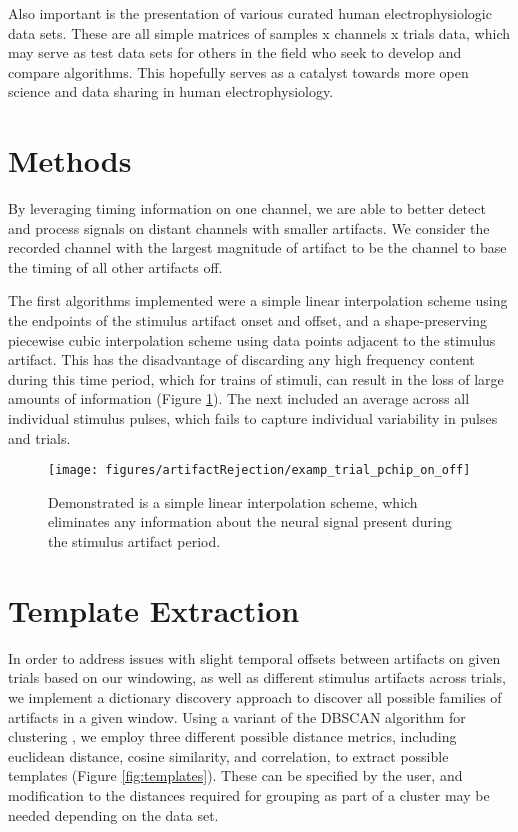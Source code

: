 Also important is the presentation of various curated human electrophysiologic data sets. These are all simple matrices of samples x channels x trials data, which may serve as test data sets for others in the field who seek to develop and compare algorithms. This hopefully serves as a catalyst towards more open science and data sharing in human electrophysiology. 

\section{Methods}
By leveraging timing information on one channel, we are able to better detect and process signals on distant channels with smaller artifacts. We consider the recorded channel with the largest magnitude of artifact to be the channel to base the timing of all other artifacts off. 

The first algorithms implemented were a simple linear interpolation scheme using the endpoints of the stimulus artifact onset and offset, and a shape-preserving piecewise cubic interpolation scheme using data points adjacent to the stimulus artifact. This has the disadvantage of discarding any high frequency content during this time period, which for trains of stimuli, can result in the loss of large amounts of information (Figure \ref{fig:exampInterp}). The next included an average across all individual stimulus pulses, which fails to capture individual variability in pulses and trials.  


\begin{figure}[ht]
	\centering
	\texttt{[image: figures/artifactRejection/examp\_trial\_pchip\_on\_off]}
	\caption[Example of linear interpolation]{Demonstrated is a simple linear interpolation scheme, which eliminates any information about the neural signal present during the stimulus artifact period. }
	\label{fig:exampInterp}
\end{figure}


\section{Template Extraction}

In order to address issues with slight temporal offsets between artifacts on given trials based on our windowing, as well as different stimulus artifacts across trials, we implement a dictionary discovery approach to discover all possible families of artifacts in a given window. Using a variant of the DBSCAN algorithm for clustering  \cite{Ester:1996:DAD:3001460.3001507}, we employ three different possible distance metrics, including euclidean distance, cosine similarity, and correlation, to extract possible templates  (Figure \ref{fig:templates}). These can be specified by the user, and modification to the distances required for grouping as part of a cluster may be needed depending on the data set.

